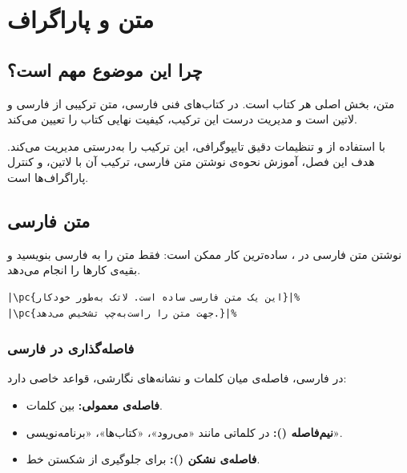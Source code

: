 
\chapter{متن و پاراگراف}
\label{chap:text}

\section{چرا این موضوع مهم است؟}
\label{sec:text-why}

متن، بخش اصلی هر کتاب است. در کتاب‌های فنی
فارسی، متن ترکیبی از فارسی و لاتین است و
مدیریت درست این ترکیب، کیفیت نهایی کتاب را
تعیین می‌کند.

 با استفاده از  و
تنظیمات دقیق تایپوگرافی، این ترکیب را به‌درستی
مدیریت می‌کند. هدف این فصل، آموزش نحوه‌ی نوشتن
متن فارسی، ترکیب آن با لاتین، و کنترل پاراگراف‌ها
است.


\section{متن فارسی}
\label{sec:text-persian}

نوشتن متن فارسی در ، ساده‌ترین
کار ممکن است: فقط متن را به فارسی بنویسید و
 بقیه‌ی کارها را انجام می‌دهد.

\begin{latin}
\begin{verbatim}
|\pc{این یک متن فارسی ساده است. لاتک به‌طور خودکار}|%
|\pc{جهت متن را راست‌به‌چپ تشخیص می‌دهد.}|%
\end{verbatim}
\end{latin}


\subsection{فاصله‌گذاری در فارسی}
\label{sec:text-persian-spacing}

در فارسی، فاصله‌ی میان کلمات و نشانه‌های نگارشی،
قواعد خاصی دارد:

\begin{itemize}
    \item \textbf{فاصله‌ی معمولی:} بین کلمات.
    \item \textbf{نیم‌فاصله ():} در کلماتی
    مانند «می‌رود»، «کتاب‌ها»، «برنامه‌نویسی».
    \item \textbf{فاصله‌ی نشکن (\lr{\textasciitilde}):}
    برای جلوگیری از شکستن خط.
\end{itemize}

